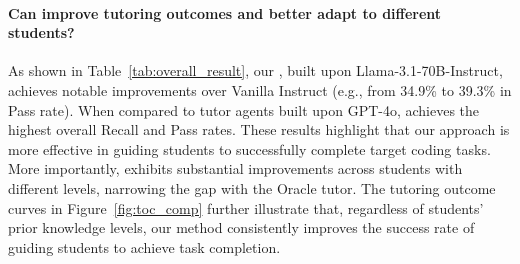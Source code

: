 \paragraph{Can \model improve tutoring outcomes and better adapt to different students?}
As shown in Table~\ref{tab:overall_result}, our \model, built upon Llama-3.1-70B-Instruct, achieves notable improvements over Vanilla Instruct (e.g., from 34.9\% to 39.3\% in Pass rate). When compared to tutor agents built upon GPT-4o, \model achieves the highest overall Recall and Pass rates. 
These results highlight that our approach is more effective in guiding students to successfully complete target coding tasks. More importantly, \model exhibits substantial improvements across students with different levels, narrowing the gap with the Oracle tutor. The tutoring outcome curves in Figure~\ref{fig:toc_comp} further illustrate that, regardless of students' prior knowledge levels, our method consistently improves the success rate of guiding students to achieve task completion. 





\begin{table*}[t!]
\centering
{}
\caption{Human evaluation results. For win and lose percentages, the higher value is bolded.}
\label{tab:human_eval_result}
\vspace{-4pt}
\end{table*}



